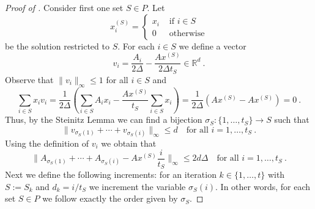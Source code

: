 \documentclass{article}
\newcommand{\R}{\mathbb{R}}
\begin{document}
\begin{proof}[Proof of ]
	Consider first one set $S\in P$.
	Let 
	\begin{equation*}
		x^{(S)}_i = \begin{cases}
			x_i &\text{ if } i\in S \\
			0 &\text{ otherwise}
		\end{cases}
	\end{equation*}
	be the solution restricted to $S$.
	For each $i\in S$ we define a vector
	\begin{equation*}
		v_i = \frac{A_i}{2\Delta} - \frac{A x^{(S)}}{2\Delta t_S} \in \R^d \ .
	\end{equation*}
	Observe that $\| v_i \|_{\infty}\le 1$ for all $i\in S$ and
	\begin{equation*}
		\sum_{i\in S} x_i v_i = \frac{1}{2\Delta}(\sum_{i\in S} A_i x_i - \frac{A x^{(S)}}{t_S} \sum_{i\in S} x_i) = \frac{1}{2\Delta}(A x^{(S)} - A x^{(S)}) = 0 \ .
	\end{equation*}
	Thus, by the Steinitz Lemma we can find a bijection $\sigma_S : \{1,\dotsc,t_S\} \rightarrow S$ such that
	\begin{equation*}
		\| v_{\sigma_S(1)} + \cdots + v_{\sigma_S(i)} \|_{\infty} \le d \quad \text{for all } i=1,\dotsc,t_S \ .
	\end{equation*}
	Using the definition of $v_i$ we obtain that
	\begin{equation*}
		\| A_{\sigma_S(1)} + \cdots + A_{\sigma_S(i)} - Ax^{(S)} \frac{i}{t_S} \|_{\infty} \le 2d\Delta \quad \text{for all } i=1,\dotsc,t_S \ .
	\end{equation*}
	Next we define the following increments: for an iteration $k\in \{1,\dotsc,t\}$ with $S := S_k$ and $d_k = i/t_S$
	we increment the variable $\sigma_S(i)$. In other words, for each set $S\in P$ we follow
	exactly the order given by $\sigma_S$.


\end{proof}
\end{document}
